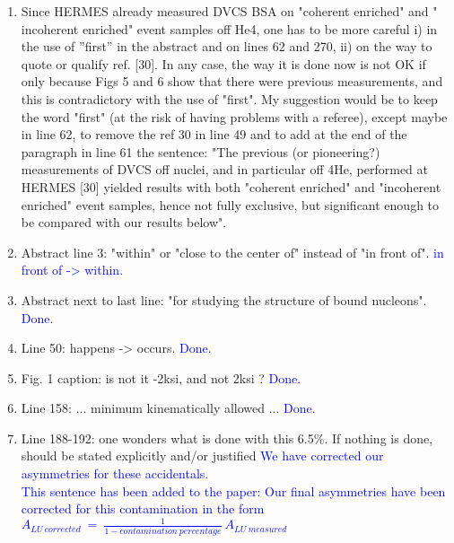 \documentclass[a4paper,11pt,twoside]{article}
\begin{document}
\begin{enumerate}

\item Since HERMES already measured DVCS BSA on "coherent enriched" and "
   incoherent enriched" event samples off He4, one has to be more careful i) in 
      the use of ''first'' in the abstract and on lines 62 and 270, ii) on the 
      way to quote or qualify ref. [30]. In any case, the way it is done now is 
      not OK if only because Figs 5 and 6 show that there were previous 
      measurements, and this is contradictory with the use of "first". My 
      suggestion would be to keep the word "first" (at the risk of having 
      problems with a referee), except maybe in line 62, to remove the ref 30 
      in line 49 and to add at the end of the paragraph in line 61 the 
      sentence: "The previous (or pioneering?) measurements of DVCS off nuclei, 
      and in particular off 4He, performed at HERMES [30] yielded results with 
      both "coherent enriched" and "incoherent enriched" event samples, hence 
      not fully exclusive, but significant enough to be compared with our 
      results below".
\textcolor{blue}{}

   \item Abstract line 3: "within" or "close to the center of" instead of "in 
      front of".
\textcolor{blue}{in front of -> within.}

   \item Abstract next to last line: "for studying the structure of bound 
      nucleons".
\textcolor{blue}{Done.}

   \item Line 50: happens -> occurs.
\textcolor{blue}{Done.}

   \item Fig. 1 caption: is not it -2ksi, and not 2ksi ?
\textcolor{blue}{Done.}

   \item Line 158: ... minimum kinematically allowed ...
\textcolor{blue}{Done.}

   \item Line 188-192: one wonders what is done with this 6.5\%. If nothing is 
      done, should be stated explicitly and/or justified
\textcolor{blue}{We have corrected our asymmetries for these accidentals.
      }\\
       \textcolor{blue}{This sentence has been added to the paper: Our final 
       asymmetries have been corrected for this contamination in the form
      $A_{LU~corrected}~=~\frac{1}{1-contamination~percentage}~A_{LU~measured}$ 
      }


\end{enumerate}
\end{document}
